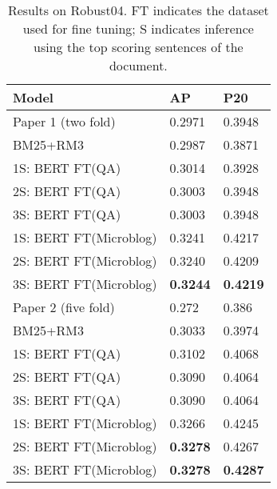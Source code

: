 \documentclass[11pt,a4paper]{article}
\begin{document}
\begin{table}[t]
\centering\begin{tabular}{lll}
\toprule
Model & AP & P20 \\
\toprule
Paper 1 (two fold) & 0.2971 & 0.3948 \\
BM25+RM3 & 0.2987  & 0.3871 \\
1S: BERT FT(QA)        & 0.3014 & 0.3928 \\
2S: BERT FT(QA)        & 0.3003 & 0.3948 \\
3S: BERT FT(QA)        & 0.3003 & 0.3948 \\
1S: BERT FT(Microblog) & 0.3241 & 0.4217 \\
2S: BERT FT(Microblog) & 0.3240 & 0.4209 \\
3S: BERT FT(Microblog) & \textbf{0.3244} & \textbf{0.4219} \\
\midrule
Paper 2 (five fold) & 0.272 &  0.386 \\
BM25+RM3 & 0.3033 & 0.3974 \\
1S: BERT FT(QA) & 0.3102 & 0.4068 \\
2S: BERT FT(QA) & 0.3090 & 0.4064 \\
3S: BERT FT(QA) & 0.3090 & 0.4064 \\
1S: BERT FT(Microblog) & 0.3266 & 0.4245 \\
2S: BERT FT(Microblog) & \textbf{0.3278} & 0.4267 \\
3S: BERT FT(Microblog) & \textbf{0.3278} & \textbf{0.4287} \\
\bottomrule
\end{tabular}\caption{Results on Robust04. FT indicates the dataset used for fine tuning; S indicates inference using the top  scoring sentences of the document.}
\label{table:newswire}
\end{table}
\end{document}
